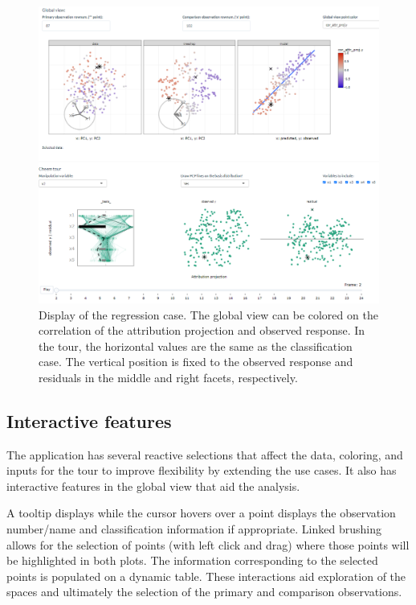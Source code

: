 \documentclass[
  article]{article}
\begin{document}
\begin{figure}

{\centering \includegraphics[width=1\linewidth]{./figures/app_regression} 

}

\caption{Display of the regression case. The global view can be colored on the correlation of the attribution projection and observed response. In the tour, the horizontal values are the same as the classification case. The vertical position is fixed to the observed response and residuals in the middle and right facets, respectively.}\label{fig:regressioncase}
\end{figure}

\hypertarget{interactive-features}{%
\subsection{Interactive features}\label{interactive-features}}

The application has several reactive selections that affect the data, coloring, and inputs for the tour to improve flexibility by extending the use cases. It also has interactive features in the global view that aid the analysis.

A tooltip displays while the cursor hovers over a point displays the observation number/name and classification information if appropriate. Linked brushing allows for the selection of points (with left click and drag) where those points will be highlighted in both plots. The information corresponding to the selected points is populated on a dynamic table. These interactions aid exploration of the spaces and ultimately the selection of the primary and comparison observations.
\end{document}
